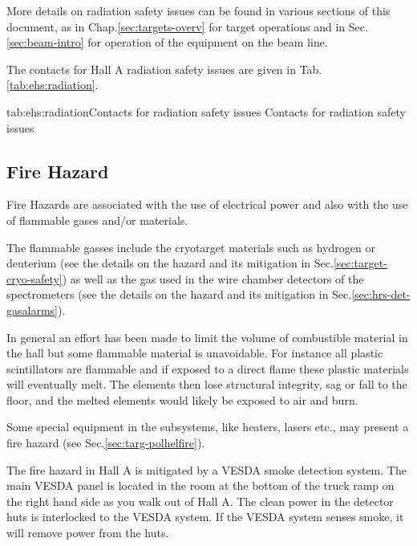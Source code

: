  More details on radiation safety issues can be found in various sections of this 
 document, as in Chap.\ref{sec:targets-overv} for target operations and
 in Sec.\ref{sec:beam-intro} for operation of the equipment on the beam line.
 
 The contacts for Hall A radiation safety issues are given in Tab.\ref{tab:ehs:radiation}.
 
 \begin{namestab}{tab:ehs:radiation}{Contacts for radiation safety issues}{%
   Contacts for radiation safety issues}
 \end{namestab}


\begin{safetyen}{0}{0}
\section{Fire Hazard} 
\label{sec:firehazard}
\end{safetyen}

 Fire Hazards are associated with the use of electrical power and also with the use of 
 flammable gases and/or materials. 

 The flammable gasses include the cryotarget
 materials such as hydrogen or deuterium 
 (see the details on the hazard and its mitigation in Sec.\ref{sec:target-cryo-safety}) as well as
 the gas used in the wire chamber detectors of the spectrometers 
 (see the details on the hazard and its mitigation in Sec.\ref{sec:hrs-det-gasalarms}).
 
 In general an effort has been made to limit the volume of combustible material 
 in the hall but some flammable material is unavoidable. For instance all plastic 
 scintillators are flammable and if exposed to a direct flame these 
 plastic materials will eventually melt. The elements then lose structural integrity, 
 sag or fall to the floor, and the melted elements would likely be exposed to air and burn.

 Some special equipment in the subsystems, like heaters, lasers etc., may present a
 fire hazard (see Sec.\ref{sec:targ-polhelfire}).
 
 The fire hazard in Hall A is mitigated by a VESDA smoke detection system. 
 The main VESDA panel is located in the room at the bottom of the truck ramp on the 
 right hand side as you walk out of Hall A. The clean power in the detector huts is 
 interlocked to the VESDA system. If the VESDA system senses smoke, it will remove power 
 from the huts.

